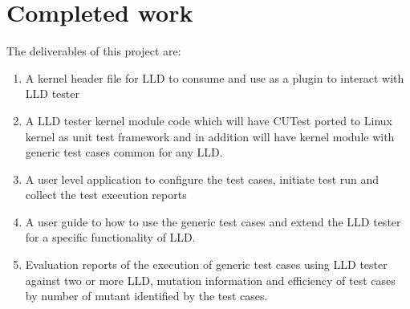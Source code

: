 
\section{Completed work} \vspace{3 mm}

The deliverables of this project are:

\begin{enumerate}
\item A kernel header file for LLD to consume and use as a plugin to interact with LLD tester
\item A LLD tester kernel module code which will have CUTest ported to Linux kernel as unit test framework and in addition will have kernel module with generic test cases common for any LLD.
\item A user level application to configure the test cases, initiate test run and collect the test execution reports
\item A user guide to how to use the generic test cases and extend the LLD tester for a specific functionality of LLD.
\item Evaluation reports of the execution of generic test cases using LLD tester against two or more LLD, mutation information and efficiency of test cases by number of mutant identified by the test cases. 

\end{enumerate}